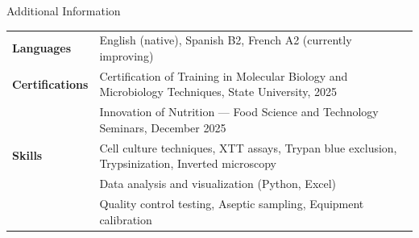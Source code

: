 \documentclass{resume} %
\begin{document}
\begin{rSection}{Additional Information}

\begin{tabular}{ @{} >{\bfseries}l @{\hspace{4ex}} p{} }
Languages      & English (native), Spanish B2, French A2 (currently improving) \\[6pt]
Certifications & Certification of Training in Molecular Biology and Microbiology Techniques,
                 State University, 2025 \\[3pt]
               & Innovation of Nutrition --- Food Science and Technology Seminars, December 2025 \\[6pt]
Skills         & Cell culture techniques, XTT assays, Trypan blue exclusion, Trypsinization, Inverted microscopy \\
               & Data analysis and visualization (Python, Excel) \\[3pt]
               & Quality control testing, Aseptic sampling, Equipment calibration \\
\end{tabular}

\end{rSection}
\end{document}
